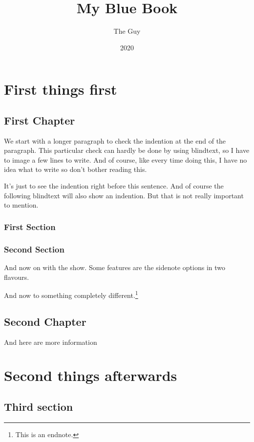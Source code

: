 \documentclass[english]{tex/bluebook}
\title{My Blue Book}
\author{The Guy}
\date{2020}
\begin{document}
	\maketitle	

	\tableofcontents

	\mainmatter
	\part{First things first}
	\chapter{First Chapter}
	We start with a longer paragraph to check the indention at the end of the paragraph.
	This particular check can hardly be done by using blindtext, so I have to image a few lines to write. And of course, like every time doing this, I have no idea what to write so don't bother reading this.
	
	It's just to see the indention right before this sentence. And of course the following blindtext will also show an indention. But that is not really important to mention.
	
	\blindtext[2]
	\section{First Section}
	\blindtext[15]
	\section{Second Section}
	And now on with the show. Some features are the sidenote options in two flavours.
	\blindtext[15]
	
	And now to something completely different.\footnote{This is an endnote.}
	
	\chapter{Second Chapter}
	And here are more information 
	\blindtext[25]
	\part{Second things afterwards}
	\chapter{Third section}
	\blindtext[30]

	
	\printendnotes	
	\printindex
	\cleardoubleemptypage
\end{document}
